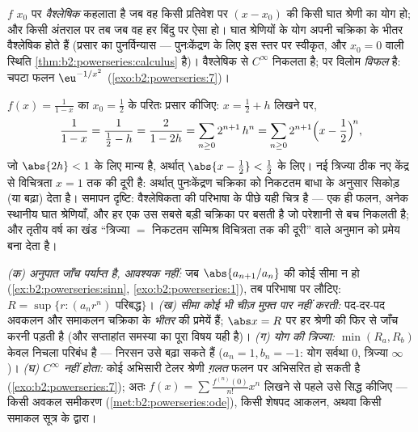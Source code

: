 \begin{definition}[वैश्लेषिक फलन]\label{def:b2:powerseries:analytic}
$f$ $x_0$ पर \emph{वैश्लेषिक} कहलाता है जब वह किसी
प्रतिवेश पर $(x - x_0)$ की किसी घात श्रेणी का योग हो; और किसी अंतराल पर तब जब वह
हर बिंदु पर ऐसा हो। घात श्रेणियों के योग अपनी चक्रिका के भीतर वैश्लेषिक
होते हैं (प्रसार का पुनर्विन्यास --- पुनःकेंद्रण के लिए इस स्तर पर
स्वीकृत, और $x_0 = 0$ वाली स्थिति \cref{thm:b2:powerseries:calculus} है)। वैश्लेषिक से $C^\infty$ निकलता है; पर विलोम
\emph{विफल} है: चपटा फलन $\eu^{-1/x^2}$ (\cref{exo:b2:powerseries:7})।
\end{definition}

\begin{example}[पुनःकेंद्रण, और दूरी के रूप में त्रिज्या]\label{ex:b2:powerseries:recenter}
$f(x) = \frac{1}{1-x}$ का $x_0 = \frac12$ के परितः प्रसार कीजिए: $x = \frac12 + h$ लिखने पर,
\[
\frac{1}{1 - x} = \frac{1}{\frac12 - h}
= \frac{2}{1 - 2h}
= \sum_{n\geq0} 2^{n+1}\,h^n
= \sum_{n\geq0} 2^{n+1}\Bigl(x - \frac12\Bigr)^{\!n},
\]
जो $\abs{2h} < 1$ के लिए मान्य है, अर्थात् $\abs{x - \frac12} < \frac12$ के लिए। नई त्रिज्या ठीक नए केंद्र से
विचित्रता $x = 1$ तक की दूरी है: अर्थात् पुनःकेंद्रण चक्रिका को निकटतम बाधा के
अनुसार सिकोड़ (या बढ़ा) देता है। समापन दृष्टि: वैश्लेषिकता की परिभाषा के
पीछे यही चित्र है --- एक ही फलन, अनेक स्थानीय घात श्रेणियाँ, और हर एक उस
सबसे बड़ी चक्रिका पर बसती है जो परेशानी से बच निकलती है; और तृतीय वर्ष का
खंड ``त्रिज्या $=$ निकटतम सम्मिश्र विचित्रता तक की दूरी'' वाले अनुमान को
प्रमेय बना देता है।
\end{example}

\begin{remark}[सामान्य भूलें]
\emph{(क) अनुपात जाँच पर्याप्त है, आवश्यक नहीं:} जब $\abs{a_{n+1}/a_n}$ की कोई सीमा न हो
(\cref{ex:b2:powerseries:sinn}, \cref{exo:b2:powerseries:1}), तब परिभाषा पर लौटिए: $R = \sup\{r : (a_nr^n)$ परिबद्ध$\}$। \emph{(ख) सीमा कोई भी
चीज़ मुफ़्त पार नहीं करती:} पद-दर-पद अवकलन और समाकलन  चक्रिका के
\emph{भीतर} की प्रमेयें हैं; $\abs x = R$ पर हर श्रेणी की फिर से जाँच करनी पड़ती
है (और सप्ताहांत समस्या का पूरा विषय यही है)। \emph{(ग) योग की त्रिज्या:}
$\min(R_a, R_b)$ केवल निचला परिबंध है --- निरसन उसे बढ़ा सकते हैं ($a_n = 1,
b_n = -1$: योग सर्वथा $0$,
त्रिज्या $\infty$)। \emph{(घ) $C^\infty$  नहीं होता:} कोई अभिसारी टेलर
श्रेणी \emph{ग़लत} फलन पर अभिसरित हो सकती है (\cref{exo:b2:powerseries:7}); अतः $f(x) = \sum
\frac{f^{(n)}(0)}{n!}x^n$ लिखने से
पहले उसे सिद्ध कीजिए --- किसी अवकल समीकरण (\cref{met:b2:powerseries:ode}), किसी शेषपद आकलन, अथवा
किसी समाकल सूत्र के द्वारा।
\end{remark}

